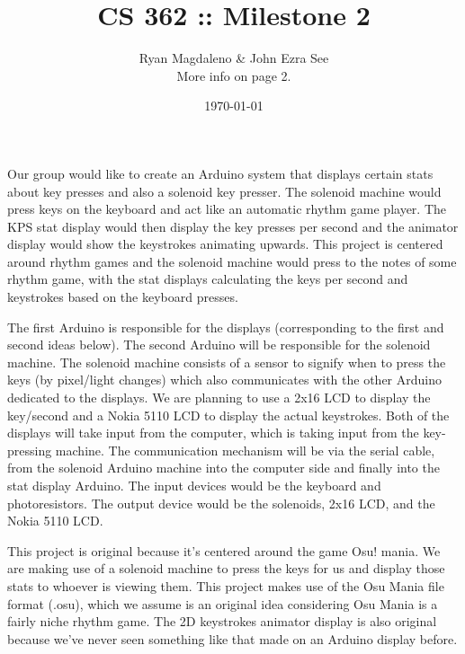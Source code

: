 \documentclass[11pt]{article}
\date{\today}
\title{CS 362 :\hspace{2px}: Milestone 2}
\author{Ryan Magdaleno \& John Ezra See\\ More info on page 2.}
\begin{document}
\maketitle
\hspace{20px}Our group would like to create an Arduino system that displays certain 
stats about key presses and also a solenoid key presser. The solenoid machine would 
press keys on the keyboard and act like an automatic rhythm game player. The KPS 
stat display would then display the key presses per second and the animator display 
would show the keystrokes animating upwards. This project is centered around rhythm
games  and the solenoid machine would press to the notes of some rhythm game, with
the stat displays calculating the keys per second and keystrokes based on the 
keyboard presses.

\hspace{20px}The first Arduino is responsible for the displays (corresponding to 
the first and second ideas below). The second Arduino will be responsible for the 
solenoid machine. The solenoid machine consists of a sensor to signify when to press 
the keys (by pixel/light changes) which also communicates with the other 
Arduino dedicated to the displays. We are planning to use a 2x16 LCD to display the
key/second and a Nokia 5110 LCD to display the actual keystrokes. Both of the 
displays will take input from the computer, which is taking input from the 
key-pressing machine. The communication mechanism will be via the serial cable, 
from the solenoid Arduino machine into the computer side and finally into the 
stat display Arduino. The input devices would be the keyboard and photoresistors.
The output device would be the solenoids, 2x16 LCD, and the Nokia 5110 LCD.

\hspace{20px}This project is original because it's centered around the game Osu! mania.
We are making use of a solenoid machine to press the keys for us and display those
stats to whoever is viewing them. This project makes use of the Osu Mania file
format (.osu), which we assume is an original idea considering Osu Mania is a fairly
niche rhythm game. The 2D keystrokes animator display is also original because
we've never seen something like that made on an Arduino display before.

\pagebreak
\end{document}
